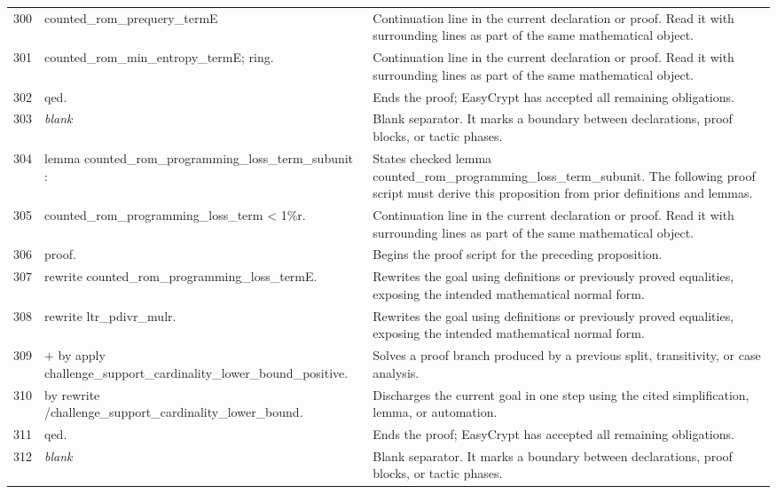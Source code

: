 \documentclass[10pt]{article}
\begin{document}
\begin{longtable}{r L{0.53\textwidth} L{0.37\textwidth}}
300 & {\ttfamily\scriptsize            counted\_rom\_prequery\_termE} & Continuation line in the current declaration or proof.  Read it with surrounding lines as part of the same mathematical object. \\
301 & {\ttfamily\scriptsize            counted\_rom\_min\_entropy\_termE; ring.} & Continuation line in the current declaration or proof.  Read it with surrounding lines as part of the same mathematical object. \\
302 & {\ttfamily\scriptsize qed.} & Ends the proof; EasyCrypt has accepted all remaining obligations. \\
303 & {\ttfamily\scriptsize \emph{blank}} & Blank separator.  It marks a boundary between declarations, proof blocks, or tactic phases. \\
304 & {\ttfamily\scriptsize lemma counted\_rom\_programming\_loss\_term\_subunit :} & States checked lemma counted\_rom\_programming\_loss\_term\_subunit.  The following proof script must derive this proposition from prior definitions and lemmas. \\
305 & {\ttfamily\scriptsize   counted\_rom\_programming\_loss\_term < 1\%r.} & Continuation line in the current declaration or proof.  Read it with surrounding lines as part of the same mathematical object. \\
306 & {\ttfamily\scriptsize proof.} & Begins the proof script for the preceding proposition. \\
307 & {\ttfamily\scriptsize rewrite counted\_rom\_programming\_loss\_termE.} & Rewrites the goal using definitions or previously proved equalities, exposing the intended mathematical normal form. \\
308 & {\ttfamily\scriptsize rewrite ltr\_pdivr\_mulr.} & Rewrites the goal using definitions or previously proved equalities, exposing the intended mathematical normal form. \\
309 & {\ttfamily\scriptsize + by apply challenge\_support\_cardinality\_lower\_bound\_positive.} & Solves a proof branch produced by a previous split, transitivity, or case analysis. \\
310 & {\ttfamily\scriptsize by rewrite /challenge\_support\_cardinality\_lower\_bound.} & Discharges the current goal in one step using the cited simplification, lemma, or automation. \\
311 & {\ttfamily\scriptsize qed.} & Ends the proof; EasyCrypt has accepted all remaining obligations. \\
312 & {\ttfamily\scriptsize \emph{blank}} & Blank separator.  It marks a boundary between declarations, proof blocks, or tactic phases. \\

\end{longtable}
\end{document}
